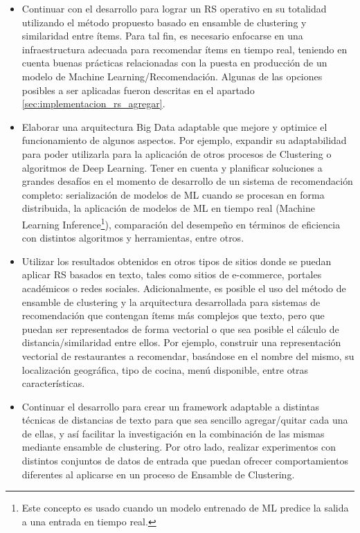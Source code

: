 \begin{itemize}
	\item Continuar con el desarrollo para lograr un RS operativo en su totalidad utilizando el método propuesto basado en ensamble de clustering y similaridad entre ítems. Para tal fin, es necesario enfocarse en una infraestructura adecuada para recomendar ítems en tiempo real, teniendo en cuenta buenas prácticas relacionadas con la puesta en producción de un modelo de Machine Learning/Recomendación. Algunas de las opciones posibles a ser aplicadas fueron descritas en el apartado \ref{sec:implementacion_rs_agregar}.
	\item Elaborar una arquitectura Big Data adaptable que mejore y optimice el funcionamiento de algunos aspectos. Por ejemplo, expandir su adaptabilidad para poder utilizarla para la aplicación de otros procesos de Clustering o algoritmos de Deep Learning. Tener en cuenta y planificar soluciones a grandes desafíos en el momento de desarrollo de un sistema de recomendación completo: serialización de modelos de ML cuando se procesan en forma distribuida, la aplicación de modelos de ML en tiempo real (Machine Learning Inference\footnote{Este concepto es usado cuando un modelo entrenado de ML predice la salida a una entrada en tiempo real.}), comparación del desempeño en términos de eficiencia con distintos algoritmos y herramientas, entre otros.
	\item Utilizar los resultados obtenidos en otros tipos de sitios donde se puedan aplicar RS basados en texto, tales como sitios de e-commerce, portales académicos o redes sociales. Adicionalmente, es posible el uso del método de ensamble de clustering y la arquitectura desarrollada para sistemas de recomendación que contengan ítems más complejos que texto, pero que puedan ser representados de forma vectorial o que sea posible el cálculo de distancia/similaridad entre ellos. Por ejemplo, construir una representación vectorial de restaurantes a recomendar, basándose en el nombre del mismo, su localización geográfica, tipo de cocina, menú disponible, entre otras características.
	\item Continuar el desarrollo para crear un framework adaptable a distintas técnicas de distancias de texto para que sea sencillo agregar/quitar cada una de ellas, y así facilitar la investigación en la combinación de las mismas mediante ensamble de clustering. Por otro lado, realizar experimentos con distintos conjuntos de datos de entrada que puedan ofrecer comportamientos diferentes al aplicarse en un proceso de Ensamble de Clustering.

\end{itemize}
